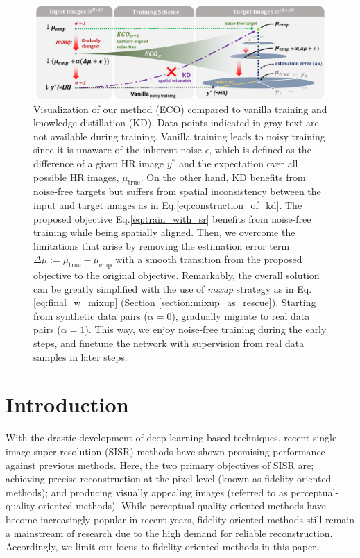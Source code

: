 \documentclass[letterpaper]{article} %
\begin{document}
\begin{figure}[t]
    \begin{center}
    \includegraphics[width=\textwidth]{figures/main_figure.pdf}
    \end{center}
    \caption{
    Visualization of our method (ECO) compared to vanilla training and knowledge distillation (KD). Data points indicated in gray text are not available during training.
    Vanilla training leads to noisy training since it is unaware of the inherent noise $\epsilon$, which is defined as the difference of a given HR image $y^*$ and the expectation over all possible HR images, $\mu_{\text{true}}$. On the other hand, KD benefits from noise-free targets but suffers from spatial inconsistency between the input and target images as in Eq.\eqref{eq:construction_of_kd}.
    The proposed objective Eq.\eqref{eq:train_with_sr} benefits from noise-free training while being spatially aligned. Then, we overcome the limitations that arise by removing the estimation error term $\Delta\mu:=\mu_\text{true}-\mu_\text{emp}$ with a smooth transition from the proposed objective to the original objective. Remarkably, the overall solution can be greatly simplified with the use of \textit{mixup} strategy as in Eq.\eqref{eq:final_w_mixup} (Section \ref{section:mixup_as_rescue}). 
    Starting from synthetic data pairs ($\alpha=0$), gradually migrate to real data pairs ($\alpha=1$). This way, we enjoy noise-free training during the early steps, and finetune the network with supervision from real data samples in later steps.
    }   
    \label{fig:main_figure}
\end{figure}

\section{Introduction}
With the drastic development of deep-learning-based techniques, recent single image super-resolution (SISR) methods have shown promising performance against previous methods. Here, the two primary objectives of SISR are; achieving precise reconstruction at the pixel level (known as fidelity-oriented methods); and producing visually appealing \cite{niqe, lpips} images (referred to as perceptual-quality-oriented methods). While perceptual-quality-oriented methods have become increasingly popular in recent years, fidelity-oriented methods still remain a mainstream of research due to the high demand for reliable reconstruction. Accordingly, we limit our focus to fidelity-oriented methods in this paper.
\end{document}
